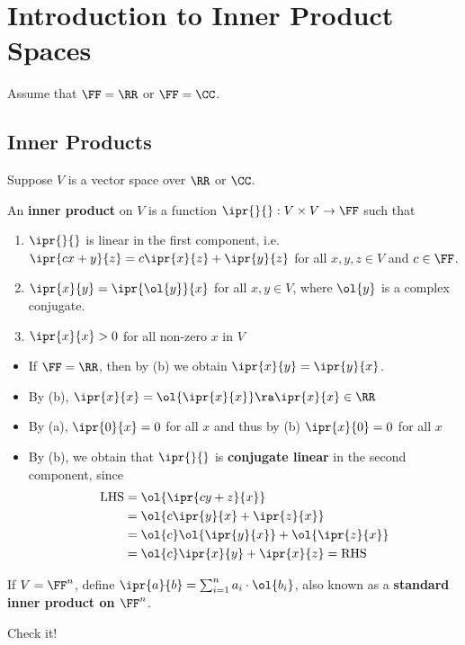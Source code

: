 \documentclass[11pt]{scrartcl}
\begin{document}
\section{Introduction to Inner Product Spaces}
Assume that $\FF = \RR$ or $\FF = \CC$.
\subsection{Inner Products}
\begin{definition}
  Suppose $V$ is a vector space over $\RR$ or $\CC$.

  An \textbf{inner product} on $V$ is a function
  $\ipr{\*}{\*}: V\times V\to \FF$ such that
  \begin{enumerate}[label=\alph*)]
  \item $\ipr{\*}{\*}$ is linear in the first component, i.e.
    $\ipr{cx+y}{ z} = c \ipr{x}{ z} + \ipr{y}{ z}$ for all
    $x, y, z \in V$ and $c\in \FF$.
  \item $\ipr{x}{ y} = \ipr{\ol{y}}{ x}$ for all $x, y \in V$, where
    $\ol{y}$ is a complex conjugate.
  \item $\ipr{x}{ x} > 0$ for all non-zero $x$ in $V$
\end{enumerate}
\end{definition}
\begin{remark}
  \begin{itemize}
    \hfill

\item If $\FF = \RR$, then by (b) we obtain $\ipr{x}{ y} = \ipr{y}{ x}$.
\item By (b), $\ipr{x}{ x} = \ol{\ipr{x}{x}} \ra \ipr{x}{ x}\in \RR$
\item By (a), $\ipr{0}{x} = 0$ for all $x$ and thus by (b) $\ipr{x}{0} = 0$ for all $x$
\item By (b), we obtain that $\ipr{\*}{ \*}$ is \textbf{conjugate linear} in the second component, since
  \begin{align}
    \text{LHS} & = \ol{\ipr{cy+z}{ x}}             \\
               & = \ol{c \ipr{y}{ x} + \ipr{z}{ x}} \\
               & = \ol{c}\*\ol{\ipr{y}{ x}} + \ol{\ipr{z}{ x}}\\
               & = \ol{c} \ipr{x}{ y} + \ipr{x}{ z} = \text{RHS}
  \end{align}
\end{itemize}

\begin{example}

  If $V = \FF^{n}$, define
  $\ipr{a}{b} = \sum_{i=1}^na_{i}\cdot \ol{b_{i}}$, also known as a
  \textbf{standard inner product on $\FF^{n}$}.

  Check it!
\end{example}
\end{remark}
\end{document}
